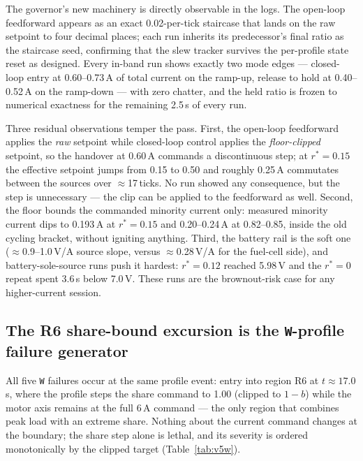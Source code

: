 \documentclass[11pt]{article}
\newcommand{\code}[1]{\texttt{#1}}
\begin{document}
The governor's new machinery is directly observable in the logs. The open-loop
feedforward appears as an exact 0.02-per-tick staircase that lands on the raw
setpoint to four decimal places; each run inherits its predecessor's final
ratio as the staircase seed, confirming that the slew tracker survives the
per-profile state reset as designed. Every in-band run shows exactly two mode
edges --- closed-loop entry at 0.60--0.73\,A of total current on the ramp-up,
release to hold at 0.40--0.52\,A on the ramp-down --- with zero chatter, and
the held ratio is frozen to numerical exactness for the remaining 2.5\,s of
every run.

Three residual observations temper the pass. First, the open-loop feedforward
applies the \emph{raw} setpoint while closed-loop control applies the
\emph{floor-clipped} setpoint, so the handover at 0.60\,A commands a
discontinuous step; at $r^\ast=0.15$ the effective setpoint jumps from 0.15 to
0.50 and roughly 0.25\,A commutates between the sources over
$\approx$17\,ticks. No run showed any consequence, but the step is unnecessary
--- the clip can be applied to the feedforward as well. Second, the floor
bounds the commanded minority current only: measured minority current dips to
0.193\,A at $r^\ast=0.15$ and 0.20--0.24\,A at 0.82--0.85, inside the old
cycling bracket, without igniting anything. Third, the battery rail is the
soft one ($\approx$0.9--1.0\,V/A source slope, versus $\approx$0.28\,V/A for
the fuel-cell side), and battery-sole-source runs push it hardest:
$r^\ast=0.12$ reached 5.98\,V and the $r^\ast=0$ repeat spent 3.6\,s below
7.0\,V. These runs are the brownout-risk case for any higher-current session.

\subsection{The R6 share-bound excursion is the \code{W}-profile failure
generator}
\label{sec:r6}

All five \code{W} failures occur at the same profile event: entry into region
R6 at $t\approx17.0$\,s, where the profile steps the share command to 1.00
(clipped to $1-b$) while the motor axis remains at the full 6\,A command ---
the only region that combines peak load with an extreme share. Nothing about
the current command changes at the boundary; the share step alone is lethal,
and its severity is ordered monotonically by the clipped target
(Table~\ref{tab:v5w}).
\end{document}
